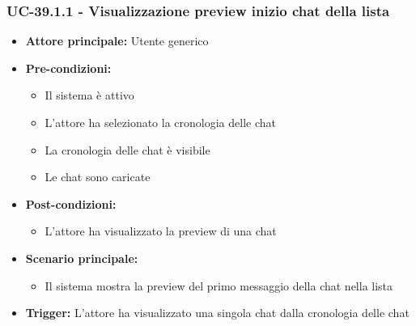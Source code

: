 \documentclass[a4paper,12pt]{article}
\begin{document}
\subsubsection{UC-39.1.1 - Visualizzazione preview inizio chat della lista} \label{subsec:UC-39.1.1}
\begin{itemize}
    \item \textbf{Attore principale:} Utente generico
    \item \textbf{Pre-condizioni:}
    \begin{itemize}
        \item Il sistema è attivo
        \item L'attore ha selezionato la cronologia delle chat
        \item La cronologia delle chat è visibile
        \item Le chat sono caricate
    \end{itemize}
    \item \textbf{Post-condizioni:} 
    \begin{itemize}
        \item L'attore ha visualizzato la preview di una chat
    \end{itemize}
    \item \textbf{Scenario principale:} 
    \begin{itemize}
        \item Il sistema mostra la preview del primo messaggio della chat nella lista
    \end{itemize}
    \item \textbf{Trigger:} L'attore ha visualizzato una singola chat dalla cronologia delle chat
\end{itemize}
\end{document}
